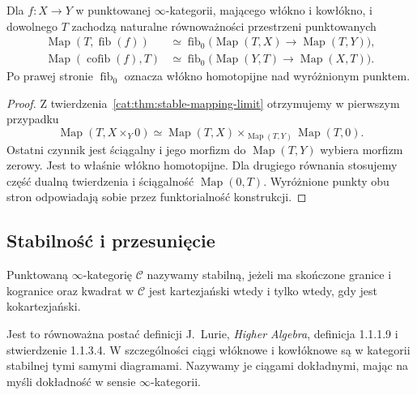 \begin{stwierdzenie}\label{cat:prop:stable-mapping-fibers}
Dla $f:X\to Y$ w punktowanej $\infty$-kategorii, mającego włókno i kowłókno, i dowolnego $T$ zachodzą naturalne równoważności przestrzeni punktowanych
\[
\begin{aligned}
 \operatorname{Map}(T,\operatorname{fib}(f))
 &\simeq\operatorname{fib}_0\bigl(\operatorname{Map}(T,X)
                    \to\operatorname{Map}(T,Y)\bigr),\\
 \operatorname{Map}(\operatorname{cofib}(f),T)
 &\simeq\operatorname{fib}_0\bigl(\operatorname{Map}(Y,T)
                    \to\operatorname{Map}(X,T)\bigr).
\end{aligned}
\]
Po prawej stronie $\operatorname{fib}_0$ oznacza włókno homotopijne nad wyróżnionym punktem.
\end{stwierdzenie}
\begin{proof}
Z twierdzenia~\ref{cat:thm:stable-mapping-limit} otrzymujemy w pierwszym przypadku
\[
 \operatorname{Map}(T,X\times_Y0)
 \simeq\operatorname{Map}(T,X)
       \times_{\operatorname{Map}(T,Y)}\operatorname{Map}(T,0).
\]
Ostatni czynnik jest ściągalny i jego morfizm do $\operatorname{Map}(T,Y)$ wybiera morfizm zerowy. Jest to właśnie włókno homotopijne. Dla drugiego równania stosujemy część dualną twierdzenia i ściągalność $\operatorname{Map}(0,T)$. Wyróżnione punkty obu stron odpowiadają sobie przez funktorialność konstrukcji.
\end{proof}

\subsection{Stabilność i przesunięcie}

\begin{definicja}\label{cat:def:stable-infty-category}
Punktowaną $\infty$-kategorię $\mathcal C$ nazywamy stabilną, jeżeli ma skończone granice i kogranice oraz kwadrat w $\mathcal C$ jest kartezjański wtedy i tylko wtedy, gdy jest kokartezjański.
\end{definicja}
Jest to równoważna postać definicji J.~Lurie, \emph{Higher Algebra}, definicja 1.1.1.9 i stwierdzenie 1.1.3.4. W szczególności ciągi włóknowe i kowłóknowe są w kategorii stabilnej tymi samymi diagramami. Nazywamy je ciągami dokładnymi, mając na myśli dokładność w sensie $\infty$-kategorii.


